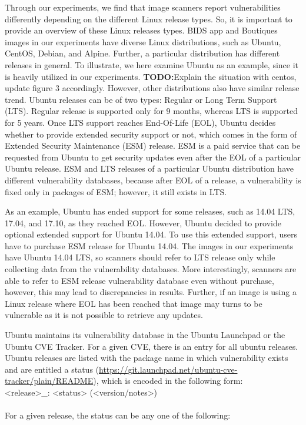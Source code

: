 \documentclass[a4paper,num-refs]{oup-contemporary}
\newcommand{\todo}[1]{\color{red}\textbf{TODO:}#1\color{black}}
\begin{document}
Through our experiments, we find that image scanners report vulnerabilities 
differently depending on the different Linux release types. So, it is 
important to provide an overview of these Linux releases types. 
BIDS app and Boutiques images in our experiments have diverse Linux
distributions, such as Ubuntu, CentOS, Debian, and Alpine. Further, a particular
distribution has different releases in general. To illustrate, we here examine Ubuntu as an example,
since it is heavily utilized in our experiments. 
\todo{Explain the situation with centos, update figure 3 accordingly.}
However, other distributions also have
similar release trend. Ubuntu releases
can be of two types: Regular or Long Term Support (LTS).
Regular release is supported only for 9 months, whereas LTS is supported for 5 years. Once LTS support
reaches End-Of-Life (EOL), Ubuntu decides whether to provide extended security support or not, which comes
in the form of Extended Security Maintenance (ESM) release.
ESM is a paid service that can be requested from Ubuntu to get security 
updates even after the EOL of a particular Ubuntu release. ESM and LTS releases of a particular Ubuntu distribution have different vulnerability
databases, because after EOL of a release, a vulnerability is fixed only in packages of ESM; however, it still
exists in LTS.

As an example, Ubuntu has ended support for some releases, such as 14.04 LTS,
17.04, and 17.10, as they reached EOL. However, Ubuntu decided to provide optional extended support for Ubuntu 14.04.
To use this extended support, users have to purchase ESM release for Ubuntu 14.04.
The images in our experiments have Ubuntu 14.04 LTS, so scanners should refer
to LTS release only while collecting data from the vulnerability databases.
More interestingly, scanners are able to refer to ESM release vulnerability database
even without purchase, however, this may lead to discrepancies in results.
Further, if an image is using a Linux release where EOL has been reached that image may
turns to be vulnerable as it is not possible to retrieve any updates.

Ubuntu maintains its vulnerability database in the Ubuntu Launchpad or the Ubuntu CVE Tracker. For a given CVE, there is an entry for all ubuntu releases.
Ubuntu releases are listed with the package name
in which vulnerability exists and are entitled a status
(\href{https://git.launchpad.net/ubuntu-cve-tracker/plain/README}{https://git.launchpad.net/ubuntu-cve-tracker/plain/README}), which is
encoded in the following form:
\newline \\
\noindent <release>\_<source-package>: <status> (<version/notes>) \\
\newline\\
For a given release, the status can be any one of the following:
\end{document}
